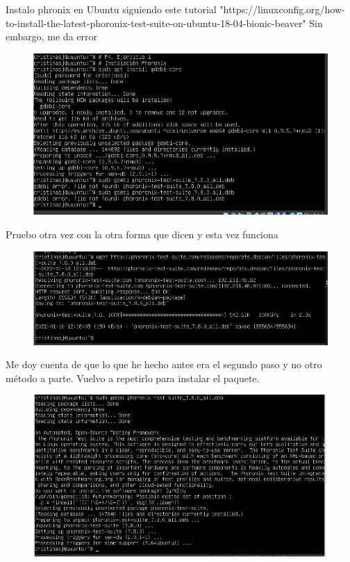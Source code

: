 Instalo phronix en Ubuntu siguiendo este tutorial "https://linuxconfig.org/how-to-install-the-latest-phoronix-test-suite-on-ubuntu-18-04-bionic-beaver"
Sin embargo, me da error 
\begin{figure}[H]
\centering
\includegraphics{phroroerror.jpg}
\end{figure} 
Pruebo otra vez con la otra forma que dicen y esta vez funciona 
\begin{figure}[H]
\centering
\includegraphics{pbien.jpg}
\end{figure} 
Me doy cuenta de que lo que he hecho antes era el segundo paso y no otro método a parte. Vuelvo a repetirlo para instalar el paquete. 
\begin{figure}[H]
\centering
\includegraphics{gdebi.jpg}
\end{figure} 
